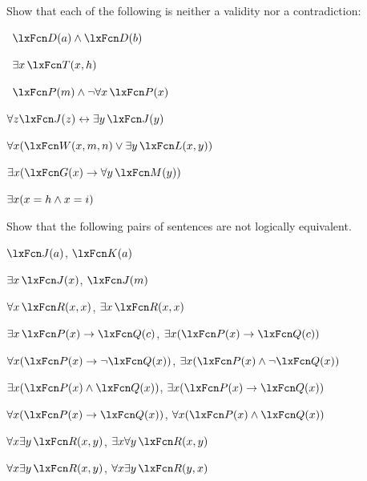 \solutions
\problempart
\label{pr.Contingent}
Show that each of the following is neither a validity nor a contradiction:
\begin{compactlist}
\item \leftsolutions\ $\atom{D}{a}  \eand \atom{D}{b}$
\item \leftsolutions\ $\exists x\, \atom{T}{x,h}$
\item \leftsolutions\ $\atom{P}{m}  \eand \enot\forall x\, \atom{P}{x}$
\item $\forall z \atom{J}{z} \eiff \exists y\, \atom{J}{y}$
\item $\forall x (\atom{W}{x,m,n} \eor \exists y\,\atom{L}{x,y})$
\item $\exists x (\atom{G}{x} \eif \forall y\, \atom{M}{y})$
\item $\exists x (x = h \wedge x = i)$
\end{compactlist}

\solutions
\problempart
\label{pr.NotEquiv}
Show that the following pairs of sentences are not logically equivalent.
\begin{compactlist}
\item $\atom{J}{a} $,  $\atom{K}{a}$
\item $\exists x\, \atom{J}{x}$,  $\atom{J}{m}$
\item $\forall x\, \atom{R}{x,x}$, $\exists x\, \atom{R}{x,x}$
\item $\exists x\, \atom{P}{x} \eif \atom{Q}{c}$, $\exists x (\atom{P}{x} \eif \atom{Q}{c})$
\item $\forall x(\atom{P}{x} \eif \enot \atom{Q}{x})$, $\exists x(\atom{P}{x} \eand \enot \atom{Q}{x})$
\item $\exists x(\atom{P}{x} \eand \atom{Q}{x})$, $\exists x(\atom{P}{x} \eif \atom{Q}{x})$
\item $\forall x(\atom{P}{x}\eif \atom{Q}{x})$, $\forall x(\atom{P}{x} \eand \atom{Q}{x})$
\item $\forall x\exists y\, \atom{R}{x,y}$, $\exists x\forall y\, \atom{R}{x,y}$
\item $\forall x\exists y\, \atom{R}{x,y}$, $\forall x\exists y\, \atom{R}{y,x}$
\end{compactlist}



